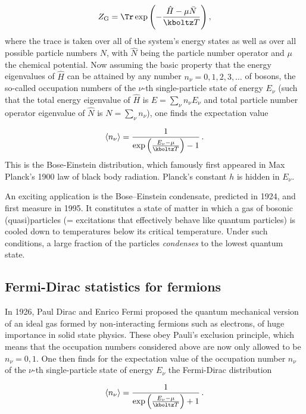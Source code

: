 \documentclass{scrartcl}
\begin{document}
\begin{equation*}
  Z_{\mathrm{G}}=\Tr \exp\left(-\frac{\hat H-\mu \bar N}{\kboltz T} \right),
\end{equation*}
%
where the trace is taken over all of the system's energy states as well as over all possible particle numbers $N$, with $\hat N$ being the particle number operator and $\mu$ the chemical potential. Now assuming the basic property that the energy eigenvalues of $\hat H$ can be attained by any number $n_\nu=0,1,2,3, \ldots$ of bosons, the so-called occupation numbers of the $\nu$-th single-particle state of energy $E_\nu$ (such that the total energy eigenvalue of $\hat H$ is $E=\sum_\nu n_\nu E_\nu$ and total particle number operator eigenvalue of $\hat N$ is $N=\sum_\nu n_\nu$), one finds the expectation value

\begin{equation*}
  \langle n_\nu \rangle=
    \frac{1}{\exp\left(\frac{E_\nu-\mu}{\kboltz T} \right)-1}\,.
\end{equation*}
%
This is the Bose-Einstein distribution, which famously first appeared in Max Planck's 1900 law of black body radiation. Planck's constant $h$ is hidden in $E_\nu$.

An exciting application is the Bose–Einstein condensate, predicted in 1924, and first measure in 1995. It constitutes a state of matter in which a gas of bosonic (quasi)particles (= excitations that effectively behave like quantum particles) is cooled down to temperatures below its critical temperature. Under such conditions, a large fraction of the particles \emph{condenses} to the lowest quantum state.


\subsection*{Fermi-Dirac statistics for fermions}

In 1926, Paul Dirac and Enrico Fermi proposed the quantum mechanical version of an ideal gas formed by non-interacting fermions such as electrons, of huge importance in solid state physics. These obey Pauli's exclusion principle, which means that the occupation numbers considered above are now only allowed to be $n_\nu=0,1$. One then finds for the expectation value of the occupation number $n_\nu$ of the $\nu$-th single-particle state of energy $E_\nu$ the Fermi-Dirac distribution

\begin{equation*}
  \langle n_\nu \rangle=
    \frac{1}{\exp\left(\frac{E_\nu-\mu}{\kboltz T} \right)+1}\,.
\end{equation*}
\end{document}
